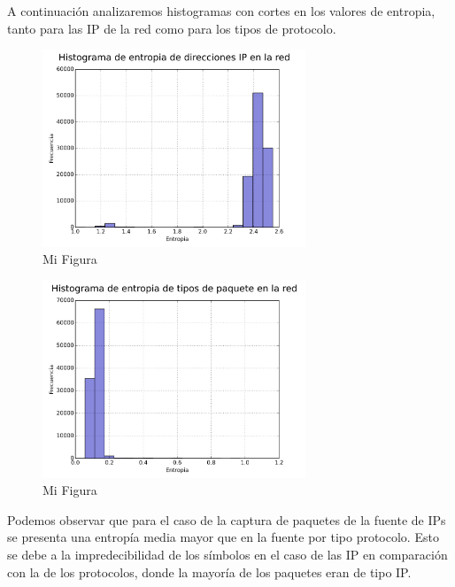 A continuación analizaremos histogramas con cortes en los valores de entropia, tanto para las IP de la red como para los tipos de protocolo.

\begin{figure}[h!]
  \centering
   \includegraphics[width=0.7\textwidth]{graficos/red_domestica_hist_arp.png}
  \caption{Mi Figura}
  \label{fig:red_domestica_hist_arp}
\end{figure}

\begin{figure}[h!]
  \centering
   \includegraphics[width=0.7\textwidth]{graficos/red_domestica_hist_type.png}
  \caption{Mi Figura}
  \label{fig:red_domestica_hist_type}
\end{figure}

Podemos observar que para el caso de la captura de paquetes de la fuente de IPs se presenta una entropía media mayor que en la fuente por tipo protocolo. Esto se debe a la impredecibilidad de los símbolos en el caso de las IP en comparación con la de los protocolos, donde la mayoría de los paquetes eran de tipo IP.

